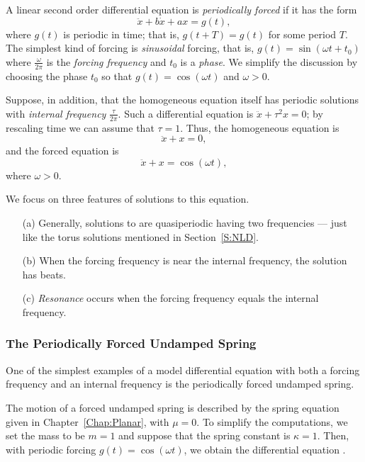 A linear second order differential equation is {\em periodically forced\/} 
 if it has the form
\[
\ddot{x} + b\dot{x} + ax = g(t),
\]
where $g(t)$ is periodic in time; that is, $g(t+T) = g(t)$ for some
period $T$.  The simplest kind of forcing is {\em sinusoidal\/} forcing,
that is, $g(t)=\sin(\omega t+ t_0)$ where $\frac{\omega}{2\pi}$ is the 
{\em forcing frequency\/} and $t_0$ is a 
{\em phase\/}.  We simplify 
the discussion by choosing the phase $t_0$ so that $g(t)=\cos(\omega t)$ 
and $\omega>0$.

Suppose, in addition, that the homogeneous equation itself has periodic 
solutions with 
{\em internal frequency\/} 
$\frac{\tau}{2\pi}$.  Such a 
differential equation is $\ddot{x}+\tau^2x=0$; by rescaling time we 
can assume that $\tau=1$.   Thus, the homogeneous equation is 
\[
\ddot x + x = 0,
\]
and the forced equation is
\begin{equation} \label{eq:uspf}
\ddot x + x = \cos(\omega t),
\end{equation}
where $\omega>0$.

We focus on three features of solutions to this equation.
\begin{itemize}
\item[(a)]	Generally, solutions to  are quasiperiodic 
having two frequencies --- just like the torus 
solutions mentioned in Section~\ref{S:NLD}.
\item[(b)]	When the forcing frequency is near the internal frequency, the
solution has beats.
\item[(c)] 	{\em Resonance\/} occurs when the 
forcing frequency equals the internal frequency.  
\end{itemize}

\subsubsection*{The Periodically Forced Undamped Spring}

One of the simplest examples of a model differential equation with both a
forcing frequency and an internal frequency is the periodically forced 
 undamped spring.

The motion of a forced undamped spring is described by the spring equation 
given in Chapter~\ref{Chap:Planar},  with $\mu = 0$.
To simplify the computations, we set the mass to be $m=1$ and suppose that 
the spring constant is $\kappa=1$.  Then, with periodic forcing 
$g(t)=\cos(\omega t)$, we obtain the differential equation .

